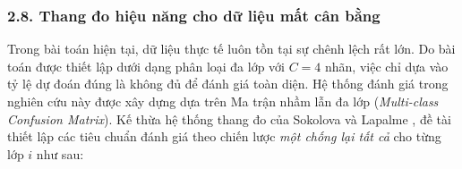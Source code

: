 \subsubsection{2.8. Thang đo hiệu năng cho dữ liệu mất cân bằng}
\label{sec:metrics}

\indent\indent Trong bài toán hiện tại, dữ liệu thực tế luôn tồn tại sự chênh lệch rất lớn. Do bài toán được thiết lập dưới dạng phân loại đa lớp với $C=4$ nhãn, việc chỉ dựa vào tỷ lệ dự đoán đúng là không đủ để đánh giá toàn diện. Hệ thống đánh giá trong nghiên cứu này được xây dựng dựa trên Ma trận nhầm lẫn đa lớp (\textit{Multi-class Confusion Matrix}). Kế thừa hệ thống thang đo của Sokolova và Lapalme \cite{sokolova2009systematic}, đề tài thiết lập các tiêu chuẩn đánh giá theo chiến lược \textit{một chống lại tất cả} cho từng lớp $i$ như sau:

